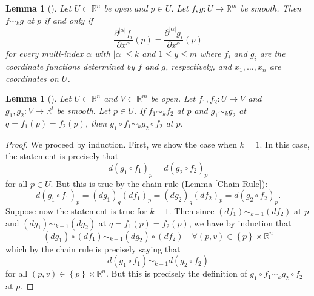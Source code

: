 \documentclass[reqno]{amsart}
\newtheorem{lemma}[theorem]{Lemma}
\theoremstyle{definition}
\theoremstyle{remark}
\begin{document}
\begin{lemma}[]\label{Jets-Taylor-Series}
    Let $U \subset \mathbb{R}^{n}$ be open and
    $p \in U$. Let $f,g \colon U \to \mathbb{R}^{m}$ be
    smooth. Then
    $f \sim_k g$ at $p$ if and only if
    \[
    \frac{\partial^{\left| \alpha \right| } f_i}{\partial
    x^{\alpha}}(p) = \frac{\partial^{\left| \alpha \right| }
g_i}{\partial x^{\alpha}}(p)
    \] 
    for every multi-index $\alpha$ with
    $\left| \alpha \right| \le k$ and
    $1\le y \le m$ where $f_i$ and $g_i$ are the
    coordinate functions determined by
    $f$ and $g$, respectively, and $x_1, \ldots, x_n$ 
    are coordinates on $U$.
\end{lemma}



\begin{lemma}[]
    Let $U \subset \mathbb{R}^{n}$ and
    $V \subset \mathbb{R}^{m}$ be open. 
    Let $f_1,f_2 \colon U \to V$ and
    $g_1,g_2 \colon V \to \mathbb{R}^{l}$ be smooth.
    Let $p \in U$.
    If $f_1 \sim_k f_2$ at $p$ and
    $g_1 \sim_k g_2$ at $q = f_1(p) = f_2(p)$, then
    $g_1 \circ f_1 \sim_k g_2 \circ f_2$ at $p$.
\end{lemma}

\begin{proof}
    We proceed by induction. First, we show the case
    when $k = 1$. In this case, the statement is precisely that
    \[
    d \left( g_1 \circ f_1 \right)_p = d\left( g_2
    \circ f_2\right)_p
    \] 
    for all $p \in U$.
    But this is true by the chain rule (Lemma
    \ref{Chain-Rule}):
    \[
    d\left( g_1 \circ f_1 \right)_p =
    \left( dg_1 \right)_q \left( df_1 \right)_p
    = \left( dg_2 \right)_q \left( df_2 \right)_p
    = d\left( g_2 \circ f_2 \right)_p.
    \] 
    Suppose now the statement is
    true for $k-1$.
    Then since
    $(df_1) \sim_{k-1} \left( df_2 \right) $ at
    $p$ and $\left( dg_1 \right) \sim_{k-1} \left( dg_2 \right) $ 
    at $q = f_1(p) = f_2(p)$, we have by
    induction that
    \[
        \left( dg_1  \right) \circ \left( df_1 \right) 
        \sim_{k-1} \left( dg_2 \right) \circ
        \left( df_2 \right) \quad
        \forall \left( p,v \right) \in \left\{ p \right\} \times 
        \mathbb{R}^{n}
    \] 
    which by the chain rule is precisely saying that
    \[
    d\left( g_1 \circ f_1 \right) \sim_{k-1}
    d\left( g_2 \circ f_2 \right) 
    \] 
    for all $(p,v) \in \left\{ p \right\} \times \mathbb{R}^{n}$.
    But this is precisely the definition of
    $g_1 \circ f_1 \sim_k g_2 \circ f_2$ at
    $p$.

\end{proof}
\end{document}
